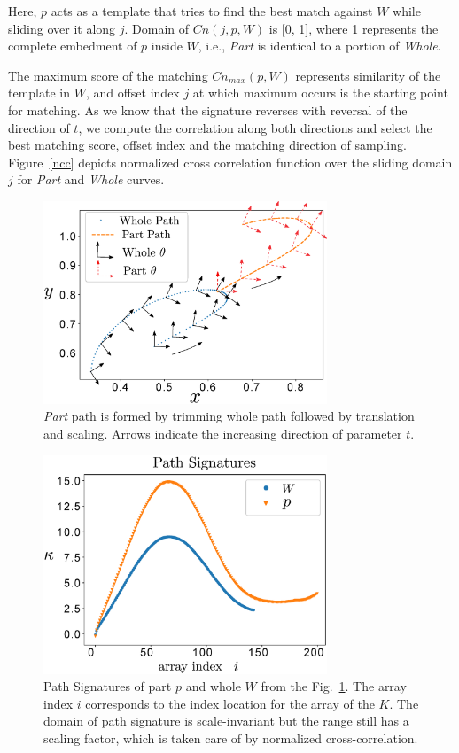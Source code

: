 \documentclass[twocolumn,10pt]{asme2ej}
\begin{document}
Here, $p$ acts as a template that tries to find the best match against $W$ while sliding over it along $j$.
Domain of $Cn(j, p, W)$ is [0, 1], where 1 represents the complete embedment of $p$ inside $W$, i.e., \emph{Part} is identical to a portion of \emph{Whole}.

The maximum score of the matching $Cn_{max}(p, W)$ represents similarity of the template in $W$, and offset index $j$ at which maximum occurs is the starting point for matching.
As we know that the signature reverses with reversal of the direction of $t$, we compute the correlation along both directions and select the best matching score, offset index and the matching direction of sampling.
Figure~\ref{ncc} depicts normalized cross correlation function over the sliding domain $j$ for \emph{Part} and \emph{Whole} curves.

\begin{figure}
\centering
\includegraphics[width=240pt]{figure/fig_whole_part.eps}
  \caption{\emph{Part} path is formed by trimming whole path followed by translation and scaling. Arrows indicate the increasing direction of parameter $t$.}
\label{wholePart}
\end{figure}

\begin{figure}
\centering
\includegraphics[width=240pt]{figure/fig_path_signatures.eps}
  \caption{Path Signatures of part $p$ and whole $W$ from the Fig.~\ref{wholePart}. The array index $i$ corresponds to the index location for the array of the $K$. The domain of path signature is scale-invariant but the range still has a scaling factor, which is taken care of by normalized cross-correlation.}
\label{pathSignature}
\end{figure}
\end{document}
